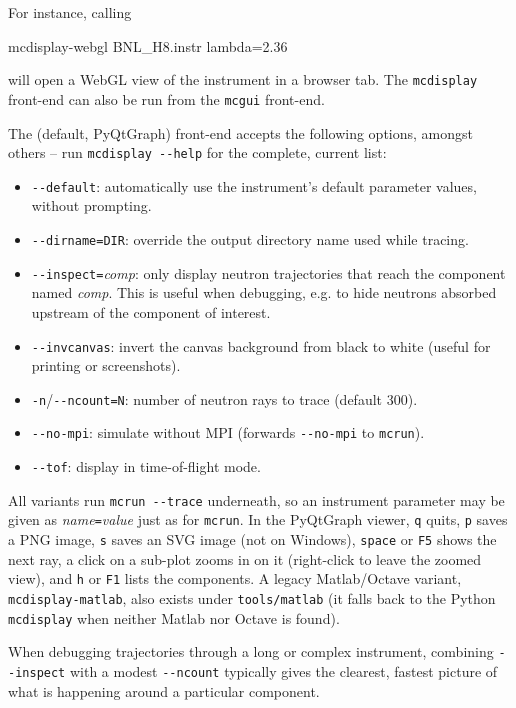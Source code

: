 For instance, calling
\begin{bash}
mcdisplay-webgl BNL_H8.instr lambda=2.36
\end{bash}
will open a WebGL view of the instrument in a browser tab.
The \verb+mcdisplay+ front-end can also be run from the \verb+mcgui+ front-end.

The (default, PyQtGraph) front-end accepts the following options, amongst
others -- run \verb+mcdisplay --help+ for the complete, current list:
\begin{itemize}
\item \verb+--default+: automatically use the instrument's default parameter
  values, without prompting.
\item \verb+--dirname=DIR+: override the output directory name used while
  tracing.
\item \verb+--inspect=+\textit{comp}: only display neutron trajectories that
  reach the component named \textit{comp}. This is useful when debugging, e.g.
  to hide neutrons absorbed upstream of the component of interest.
\item \verb+--invcanvas+: invert the canvas background from black to white
  (useful for printing or screenshots).
\item \verb+-n+/\verb+--ncount=N+: number of neutron rays to trace (default 300).
\item \verb+--no-mpi+: simulate without MPI (forwards \verb+--no-mpi+ to
  \verb+mcrun+).
\item \verb+--tof+: display in time-of-flight mode.
\end{itemize}
All variants run \verb+mcrun --trace+ underneath, so an instrument parameter
may be given as \textit{name}\verb+=+\textit{value} just as for \verb+mcrun+.
In the PyQtGraph viewer, \texttt{q} quits, \texttt{p} saves a PNG image,
\texttt{s} saves an SVG image (not on Windows), \texttt{space} or \texttt{F5}
shows the next ray, a click on a sub-plot zooms in on it (right-click to leave
the zoomed view), and \texttt{h} or \texttt{F1} lists the components.
A legacy Matlab/Octave variant, \verb+mcdisplay-matlab+, also exists under
\texttt{tools/matlab} (it falls back to the Python \verb+mcdisplay+ when
neither Matlab nor Octave is found).

When debugging trajectories through a long or complex instrument, combining
\verb+--inspect+ with a modest \verb+--ncount+ typically gives the clearest,
fastest picture of what is happening around a particular component.

